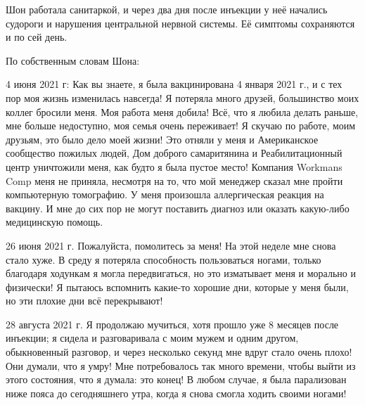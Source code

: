 Шон работала санитаркой, и через два дня после инъекции у неё начались судороги
и нарушения центральной нервной системы. Её симптомы сохраняются и по сей день.

По собственным словам Шона:

4 июня 2021 г: Как вы знаете, я была вакцинирована 4 января 2021 г., и с тех пор
моя жизнь изменилась навсегда! Я потеряла много друзей, большинство моих коллег
бросили меня. Моя работа меня добила! Всё, что я любила делать раньше, мне
больше недоступно, моя семья очень переживает! Я скучаю по работе, моим друзьям,
это было дело моей жизни! Это отняли у меня и Американское сообщество пожилых
людей, Дом доброго самаритянина и Реабилитационный центр уничтожили меня, как
будто я была пустое место! Компания Workmans Comp меня не приняла, несмотря на
то, что мой менеджер сказал мне пройти компьютерную томографию. У меня произошла
аллергическая реакция на вакцину. И мне до сих пор не могут поставить диагноз
или оказать какую-либо медицинскую помощь.

26 июня 2021 г.  Пожалуйста, помолитесь за меня! На этой неделе мне снова стало
хуже. В среду я потеряла способность пользоваться ногами, только благодаря
ходункам я могла передвигаться, но это изматывает меня и морально и физически! Я
пытаюсь вспомнить какие-то хорошие дни, которые у меня были, но эти плохие дни
всё перекрывают!

28 августа 2021 г.  Я продолжаю мучиться, хотя прошло уже 8 месяцев после
инъекции; я сидела и разговаривала с моим мужем и одним другом, обыкновенный
разговор, и через несколько секунд мне вдруг стало очень плохо! Они думали, что
я умру! Мне потребовалось так много времени, чтобы выйти из этого состояния, что
я думала: это конец! В любом случае, я была парализован ниже пояса до
сегодняшнего утра, когда я снова смогла ходить своими ногами!
